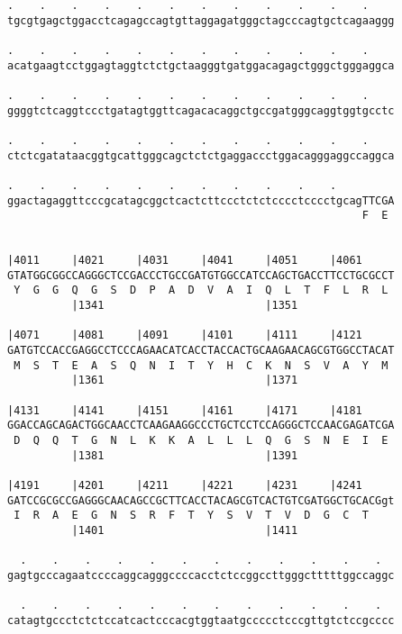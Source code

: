\documentclass{article}
\begin{document}
\begin{Verbatim}
.    .    .    .    .    .    .    .    .    .    .    .    
tgcgtgagctggacctcagagccagtgttaggagatgggctagcccagtgctcagaaggg
                                                            
.    .    .    .    .    .    .    .    .    .    .    .    
acatgaagtcctggagtaggtctctgctaagggtgatggacagagctgggctgggaggca
                                                            
.    .    .    .    .    .    .    .    .    .    .    .    
ggggtctcaggtccctgatagtggttcagacacaggctgccgatgggcaggtggtgcctc
                                                            
.    .    .    .    .    .    .    .    .    .    .    .    
ctctcgatataacggtgcattgggcagctctctgaggaccctggacagggaggccaggca
                                                            
.    .    .    .    .    .    .    .    .    .    .         
ggactagaggttcccgcatagcggctcactcttccctctctcccctcccctgcagTTCGA
                                                       F  E 
                                                            
  
|4011     |4021     |4031     |4041     |4051     |4061     
GTATGGCGGCCAGGGCTCCGACCCTGCCGATGTGGCCATCCAGCTGACCTTCCTGCGCCT
 Y  G  G  Q  G  S  D  P  A  D  V  A  I  Q  L  T  F  L  R  L 
          |1341                         |1351               
  
|4071     |4081     |4091     |4101     |4111     |4121     
GATGTCCACCGAGGCCTCCCAGAACATCACCTACCACTGCAAGAACAGCGTGGCCTACAT
 M  S  T  E  A  S  Q  N  I  T  Y  H  C  K  N  S  V  A  Y  M 
          |1361                         |1371               
  
|4131     |4141     |4151     |4161     |4171     |4181     
GGACCAGCAGACTGGCAACCTCAAGAAGGCCCTGCTCCTCCAGGGCTCCAACGAGATCGA
 D  Q  Q  T  G  N  L  K  K  A  L  L  L  Q  G  S  N  E  I  E 
          |1381                         |1391               
  
|4191     |4201     |4211     |4221     |4231     |4241     
GATCCGCGCCGAGGGCAACAGCCGCTTCACCTACAGCGTCACTGTCGATGGCTGCACGgt
 I  R  A  E  G  N  S  R  F  T  Y  S  V  T  V  D  G  C  T    
          |1401                         |1411               
  
  .    .    .    .    .    .    .    .    .    .    .    .  
gagtgcccagaatccccaggcagggccccacctctccggccttgggctttttggccaggc
                                                            
  .    .    .    .    .    .    .    .    .    .    .    .  
catagtgccctctctccatcactcccacgtggtaatgccccctcccgttgtctccgcccc
                                                            

\end{Verbatim}
\end{document}
